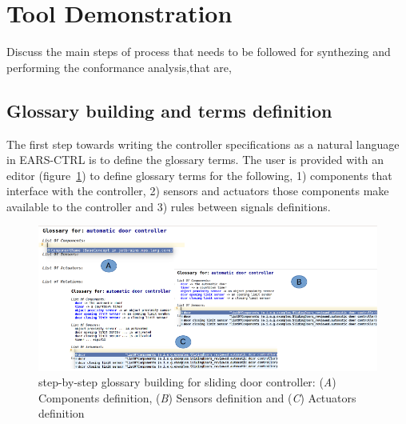 \vspace{-.5cm}
\section{Tool Demonstration}
\label{sec:demo}
\vspace{-.5cm}
Discuss the main steps of process that needs to be followed for synthezing
and performing the conformance analysis,that are, 
\vspace{-.5cm}
\subsection{Glossary building and terms definition}
\vspace{-.4cm}
The first step towards writing the controller specifications as a natural
language in EARS-CTRL is to define the glossary terms. 
The user is provided with an editor
(figure~\ref{fig:glossary_def}) to define glossary terms for the following,
1) components that interface with the controller, 2) sensors and actuators those components make available to the controller and 3) rules between
signals definitions.
\vspace{-.5cm}
\begin{figure}[!h]
\centering
\includegraphics[width=1\textwidth]{./images/glossary_def1.png}
\caption{step-by-step glossary building for sliding door controller: (\emph{A})
Components definition, (\emph{B}) Sensors definition and (\emph{C}) Actuators
definition}
\label{fig:glossary_def}
\end{figure}
\vspace{-2cm}
